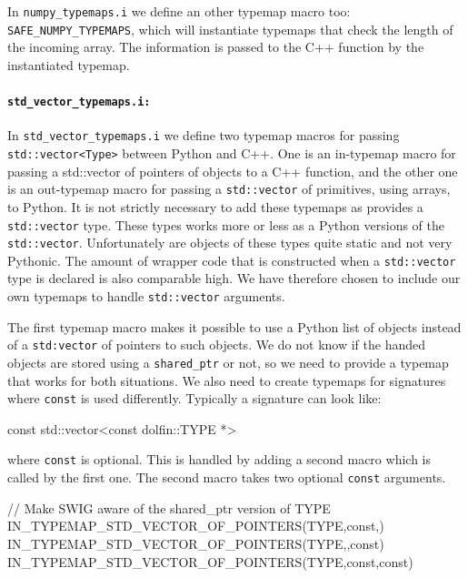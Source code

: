 \begin{code}
In \texttt{numpy\_typemaps.i} we define an other typemap macro too: \texttt{SAFE\_}\-\texttt{NUMPY\_}\-\texttt{TYPEMAPS}, which will instantiate typemaps that check the length of the incoming \numpy array. The information is passed to the C++ function by the instantiated typemap.\par

\paragraph{\texttt{std\_vector\_typemaps.i:}}
In \texttt{std\_vector\_typemaps.i} we define two typemap macros for passing \texttt{std::}\-\texttt{vector<Type>} between Python and C++. One is an in-typemap macro for passing a std::vector of pointers of \dolfin objects to a C++ function, and the other one is an out-typemap macro for passing a \texttt{std::vector} of primitives, using \numpy arrays, to Python. It is not strictly necessary to add these typemaps as \swig provides a \texttt{std::vector} type. These types works more or less as a Python versions of the \texttt{std::vector}. Unfortunately are objects of these types quite static and not very Pythonic. The amount of wrapper code that is constructed when a \texttt{std::vector} type is declared is also comparable high. We have therefore chosen to include our own typemaps to handle \texttt{std::vector} arguments.\par

The first typemap macro makes it possible to use a Python list of \dolfin objects instead of a \texttt{std:vector} of pointers to such objects. We do not know if the handed \dolfin objects are stored using a \texttt{shared\_ptr} or not, so we need to provide a typemap that works for both situations. We also need to create typemaps for signatures where \texttt{const} is used differently. Typically a signature can look like:
\begin{code}
{const} std::vector<{const} dolfin::TYPE *>
\end{code}
where \texttt{const} is optional. This is handled by adding a second macro which is called by the first one. The second macro takes two optional \texttt{const} arguments.
\begin{code}
// Make SWIG aware of the shared_ptr version of TYPE
IN_TYPEMAP_STD_VECTOR_OF_POINTERS(TYPE,const,)
IN_TYPEMAP_STD_VECTOR_OF_POINTERS(TYPE,,const)
IN_TYPEMAP_STD_VECTOR_OF_POINTERS(TYPE,const,const)


\end{code}
\end{code}
